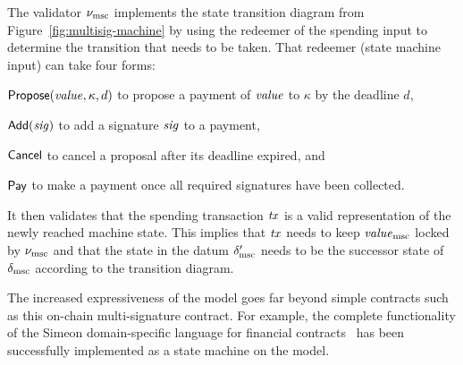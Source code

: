 The validator $\nu_{\mathrm{msc}}$ implements the state transition diagram from
Figure~\ref{fig:multisig-machine} by using the redeemer of the spending input to determine the transition that needs to be taken. That redeemer (state machine input) can take four forms: 
\begin{inparaenum}[(1)]
\item \(\mathsf{Propose}(\mathit{value}, \kappa, d)\) to propose a payment of $\mathit{value}$ to $\kappa$
  by the deadline $d$, 
\item \(\mathsf{Add}(\mathit{sig})\) to add a signature $\mathit{sig}$ to a payment, 
\item $\mathsf{Cancel}$ to cancel a proposal after its deadline expired, and 
\item $\mathsf{Pay}$ to make a payment once all required signatures have been collected. 
\end{inparaenum}
It then validates that the spending transaction $\mathit{tx}$ is a valid
representation of the newly reached machine state. This implies that
$\mathit{tx}$ needs to keep $\mathit{value}_{\mathrm{msc}}$ locked by $\nu_{\mathrm{msc}}$ and that the
state in the datum $\delta^{\prime}_{\mathrm{msc}}$ needs to be the successor state
of $\delta_{\mathrm{msc}}$ according to the transition diagram.

The increased expressiveness of the \EUTXO{} model goes far beyond
simple contracts such as this on-chain multi-signature contract. For
example, the complete functionality of the Simeon domain-specific
language for financial contracts~\cite{simeon} has been successfully
implemented as a state machine on the \EUTXO{} model.
